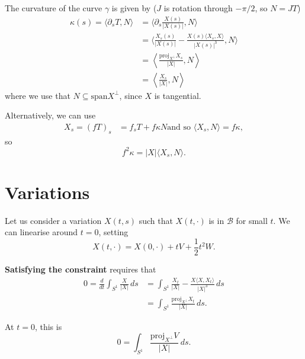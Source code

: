 \documentclass[12pt, a4paper]{amsart}
\theoremstyle{remark}
\begin{document}
The curvature of the curve $\gamma$ is given by ($J$ is rotation through $-\pi/2$, so $N=JT$)
\begin{align*}
\kappa(s)=\langle \partial_s T,N\rangle 
&= \langle \partial_s \frac{X(s)}{|X(s)|}, N \rangle \\
&=\langle  \frac{X_s(s)}{|X(s)|}-  \frac{X(s)\langle X_s ,X\rangle }{|X(s)|^3},  N \rangle  \\
&=\left\langle  \frac{\text{proj}_{X^\perp} X_s}{|X|},N  \right\rangle\\
&=\left\langle \frac{X_s}{|X|}, N\right\rangle
\end{align*}
where we use that $N\subseteq \text{span} X^\perp$, since $X$ is tangential.   

Alternatively, we can use
\begin{align*}
X_s=(fT)_s&=f_sT+f \kappa N \text {and so } \langle X_s, N \rangle= f\kappa, 
\end{align*}
so
$$f^2\kappa=|X|  \langle X_s, N \rangle. $$

\section*{Variations}

Let us consider a variation $X(t,s)$ such that $X(t,\cdot)$ is in $\mathcal{B}$ for small $t$.      We can linearise around $t=0$, setting 
$$X(t,\cdot)=X(0,\cdot)+ t V+\frac12t^2 W.$$

\textbf{Satisfying the constraint} requires that 
\begin{align*}
0=   \frac{d}{dt}  \int_{S^1} \frac{X}{|X|}\,ds &= 
 \int_{S^1} \frac{X_t}{|X|}-  \frac{X \langle X,X_t\rangle}{|X|^3}     \,ds
 \\&= 
  \int_{S^1} \frac{\text{proj}_{X^\perp} X_t}{|X|}   \,ds.
\end{align*}

At $t=0$, this is 
$$ 0= \int_{S^1} \frac{\text{proj}_{X^\perp} V}{|X|}   \,ds. $$
\end{document}
